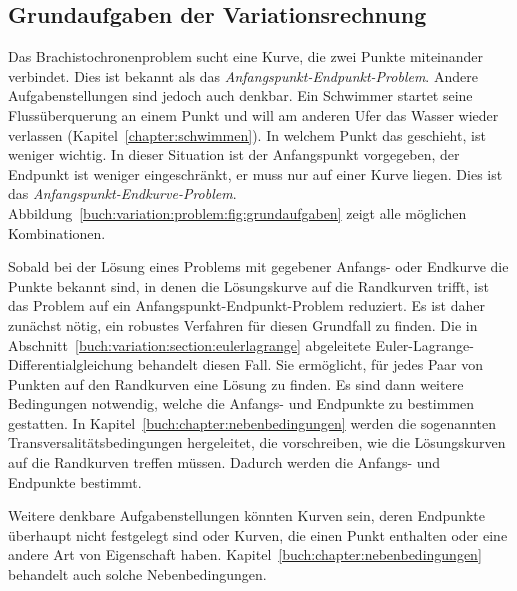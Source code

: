 %
%
\subsection{Grundaufgaben der Variationsrechnung
\label{buch:variation:subsection:grundaufgaben}}

Das Brachistochronenproblem sucht eine Kurve, die zwei Punkte miteinander
verbindet.
Dies ist bekannt als das {\em Anfangspunkt-Endpunkt-Problem}.
%
Andere Aufgabenstellungen sind jedoch auch denkbar.
Ein Schwimmer startet seine Flussüberquerung an einem Punkt
und will am anderen Ufer das Wasser wieder verlassen
(Kapitel~\ref{chapter:schwimmen}).
In welchem Punkt das geschieht, ist weniger wichtig.
In dieser Situation ist der Anfangspunkt vorgegeben, der Endpunkt ist
weniger eingeschränkt, er muss nur auf einer Kurve liegen.
Dies ist das {\em Anfangspunkt-Endkurve-Problem}.
Abbildung~\ref{buch:variation:problem:fig:grundaufgaben}
%
zeigt alle möglichen Kombinationen.

Sobald bei der Lösung eines Problems mit gegebener Anfangs- oder Endkurve
die Punkte bekannt sind, in denen die Lösungskurve auf die Randkurven
trifft, ist das Problem auf ein Anfangspunkt-Endpunkt-Problem reduziert.
Es ist daher zunächst nötig, ein robustes Verfahren für diesen Grundfall
zu finden.
Die in Abschnitt~\ref{buch:variation:section:eulerlagrange}
abgeleitete Euler-Lagrange-Differentialgleichung behandelt diesen
Fall.
Sie ermöglicht, für jedes Paar von Punkten auf den Randkurven
eine Lösung zu finden.
Es sind dann weitere Bedingungen notwendig, welche die Anfangs- und
Endpunkte zu bestimmen gestatten.
In Kapitel~\ref{buch:chapter:nebenbedingungen} werden die sogenannten
Transversalitätsbedingungen hergeleitet, die vorschreiben, wie die
Lösungskurven auf die Randkurven treffen müssen.
Dadurch werden die Anfangs- und Endpunkte bestimmt.

Weitere denkbare Aufgabenstellungen könnten Kurven sein, deren Endpunkte
überhaupt nicht festgelegt sind oder Kurven, die einen Punkt enthalten
oder eine andere Art von Eigenschaft haben.
Kapitel~\ref{buch:chapter:nebenbedingungen} behandelt auch solche
Nebenbedingungen.


